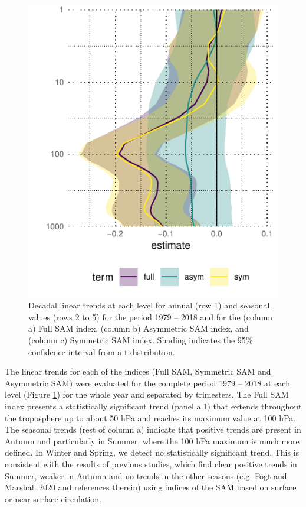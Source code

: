 \documentclass[smallextended]{svjour3}       %
\begin{document}
\begin{figure}
\includegraphics{figures/trends-1} \caption{Decadal linear trends at each level for annual (row 1) and seasonal values (rows 2 to 5) for the period 1979 -- 2018 and for the (column a) Full SAM index, (column b) Asymmetric SAM index, and (column c) Symmetric SAM index. Shading indicates the 95\% confidence interval from a t-distribution.}\label{fig:trends}
\end{figure}

The linear trends for each of the indices (Full SAM, Symmetric SAM and Asymmetric SAM) were evaluated for the complete period 1979 -- 2018 at each level (Figure \ref{fig:trends}) for the whole year and separated by trimesters. The Full SAM index presents a statistically significant trend (panel a.1) that extends throughout the troposphere up to about 50 hPa and reaches its maximum value at 100 hPa. The seasonal trends (rest of column a) indicate that positive trends are present in Autumn and particularly in Summer, where the 100 hPa maximum is much more defined. In Winter and Spring, we detect no statistically significant trend. This is consistent with the results of previous studies, which find clear positive trends in Summer, weaker in Autumn and no trends in the other seasons (e.g. Fogt and Marshall 2020 and references therein) using indices of the SAM based on surface or near-surface circulation.
\end{document}
